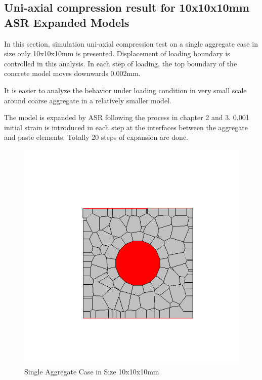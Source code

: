 \subsection{Uni-axial compression result for 10x10x10mm ASR Expanded Models}

In this section, simulation uni-axial compression test on a single aggregate case in size only 10x10x10mm is presented. Displacement of loading boundary is controlled in this analysis. In each step of loading, the top boundary of the concrete model moves downwards 0.002mm.

It is easier to analyze the behavior under loading condition in very small scale around coarse aggregate in a relatively smaller model.

The model is expanded by ASR following the process in chapter 2 and 3. 0.001 initial strain is introduced in each step at the interfaces between the aggregate and paste elements. Totally 20 steps of expansion are done.


\begin{figure}[h!]
\centering
\includegraphics[width=0.4\linewidth]{Files/Small_ASR/CR/DEP5-STEP(001).png}
\caption{Single Aggregate Case in Size 10x10x10mm}
\end{figure}

